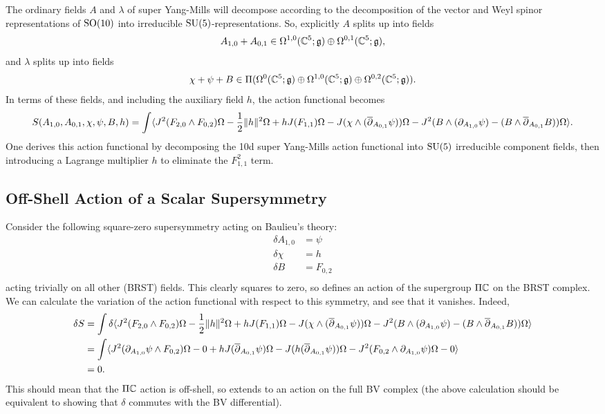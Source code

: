 \documentclass[10pt, oneside]{article}
\begin{document}
The ordinary fields $A$ and $\lambda$ of super Yang-Mills will decompose according to the decomposition of the vector and Weyl spinor representations of $\mathrm{SO}(10)$ into irreducible $\mathrm{SU}(5)$-representations.  So, explicitly $A$ splits up into fields
\[A_{1,0} + A_{0,1} \in \Omega^{1,0}(\mathbb{C}^5; \mathfrak{g}) \oplus \Omega^{0,1}(\mathbb{C}^5; \mathfrak{g}),\]
and $\lambda$ splits up into fields
\[\chi + \psi + B \in \Pi(\Omega^0(\mathbb{C}^5; \mathfrak{g}) \oplus \Omega^{1,0}(\mathbb{C}^5; \mathfrak{g}) \oplus \Omega^{0,2}(\mathbb{C}^5; \mathfrak{g})).\]
In terms of these fields, and including the auxiliary field $h$, the action functional becomes
\[S(A_{1,0}, A_{0,1}, \chi, \psi, B, h) = \int \langle J^2(F_{2, 0}\wedge F_{0,2})\Omega - \frac 12 \|h\|^2\Omega + h J(F_{1,1}) \Omega - J( \chi \wedge (\overline{\partial}_{A_{0,1}} \psi)) \Omega - J^2(B \wedge (\partial_{A_{1,0}} \psi) - (B \wedge \overline{\partial}_{A_{0,1}} B)) \Omega \rangle.\]
One derives this action functional by decomposing the 10d super Yang-Mills action functional into $\mathrm{SU}(5)$ irreducible component fields, then introducing a Lagrange multiplier $h$ to eliminate the $F_{1,1}^2$ term.

\subsection{Off-Shell Action of a Scalar Supersymmetry}

Consider the following square-zero supersymmetry acting on Baulieu's theory:
\begin{align*}
\delta A_{1,0} &= \psi \\
\delta \chi &= h \\
\delta B &= F_{0,2} \\
\end{align*}
acting trivially on all other (BRST) fields.  This clearly squares to zero, so defines an action of the supergroup $\Pi \mathbb{C}$ on the BRST complex.  We can calculate the variation of the action functional with respect to this symmetry, and see that it vanishes.  Indeed,
\begin{align*}
\delta S &= \int \delta \langle J^2(F_{2, 0}\wedge F_{0,2})\Omega - \frac 12 \|h\|^2\Omega + h J(F_{1,1}) \Omega - J( \chi \wedge (\overline{\partial}_{A_{0,1}} \psi)) \Omega - J^2(B \wedge (\partial_{A_{1,0}} \psi) - (B \wedge \overline{\partial}_{A_{0,1}} B)) \Omega \rangle \\
&= \int \langle J^2(\partial_{A_{1,0}} \psi \wedge F_{0,2})\Omega - 0 + h J(\overline{\partial}_{A_{0,1}} \psi) \Omega - J( h (\overline{\partial}_{A_{0,1}} \psi)) \Omega - J^2(F_{0,2} \wedge \partial_{A_{1,0}} \psi)\Omega - 0\rangle \\
&= 0.
\end{align*}
This should mean that the $\Pi \mathbb{C}$ action is off-shell, so extends to an action on the full BV complex (the above calculation should be equivalent to showing that $\delta$ commutes with the BV differential).
\end{document}

